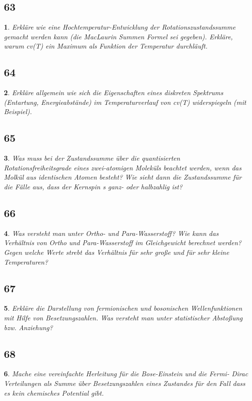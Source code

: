 \documentclass[12pt,a4paper]{report}
\newtheorem{myfrag}{}%
\begin{document}
\subsection{63}
\begin{myfrag}
Erkläre wie eine Hochtemperatur-Entwicklung der Rotationszustandssumme
gemacht werden kann (die MacLaurin Summen Formel sei gegeben). Erkläre,
warum cv(T) ein Maximum als Funktion der Temperatur durchläuft.
\end{myfrag}
\subsection{64}
\begin{myfrag}
Erkläre allgemein wie sich die Eigenschaften eines diskreten Spektrums
(Entartung, Energieabstände) im Temperaturverlauf von cv(T) widerspiegeln
(mit Beispiel).
\end{myfrag}
\subsection{65}
\begin{myfrag}
Was muss bei der Zustandssumme über die quantisierten
Rotationsfreiheitsgrade eines zwei-atomigen Moleküls beachtet werden, wenn
das Molkül aus identischen Atomen besteht? Wie sieht dann die
Zustandssumme für die Fälle aus, dass der Kernspin s ganz- oder halbzahlig
ist?
\end{myfrag}
\subsection{66}
\begin{myfrag}
Was versteht man unter Ortho- und Para-Wasserstoff? Wie kann das
Verhältnis von Ortho und Para-Wasserstoff im Gleichgewicht berechnet
werden? Gegen welche Werte strebt das Verhältnis für sehr große und für
sehr kleine Temperaturen?
\end{myfrag}
\subsection{67}
\begin{myfrag}
Erkläre die Darstellung von fermionischen und bosonischen Wellenfunktionen
mit Hilfe von Besetzungszahlen. Was versteht man unter
statistischer Abstoßung bzw. Anziehung?
\end{myfrag}
\subsection{68}
\begin{myfrag}
Mache eine vereinfachte Herleitung für die Bose-Einstein und die Fermi-
Dirac Verteilungen als Summe über Besetzungszahlen eines Zustandes für
den Fall dass es kein chemisches Potential gibt.
\end{myfrag}
\end{document}
